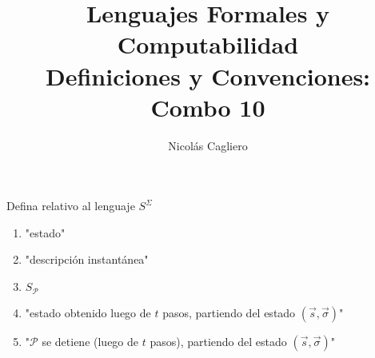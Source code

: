 \documentclass{article}
\title{Lenguajes Formales y Computabilidad \\
        \large Definiciones y Convenciones: Combo 10 }
\author{Nicolás Cagliero}
\begin{document}
\maketitle

Defina relativo al lenguaje $S^{\Sigma}$
\begin{enumerate}
    \item "estado"

    \item "descripción instantánea"
    
    \item $S_{\mathcal{P}}$
    
    \item "estado obtenido luego de $t$ pasos, partiendo del estado 
    $(\overset{\rightarrow}{s}, \overset{\rightarrow}{\sigma})$"
    
    \item "$\mathcal{P}$ se detiene (luego de $t$ pasos), partiendo del estado
    $(\overset{\rightarrow}{s}, \overset{\rightarrow}{\sigma})$"
\end{enumerate}
\end{document}
